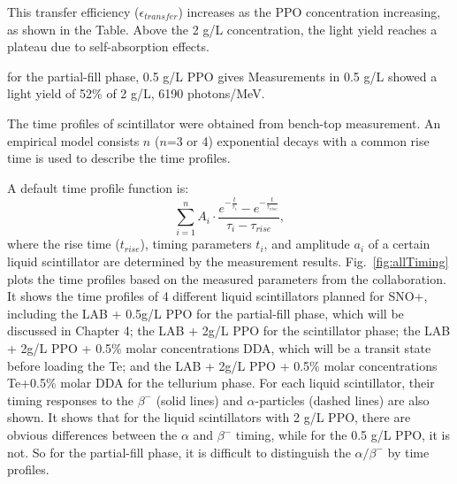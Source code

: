 
This transfer efficiency ($\mathcal{\epsilon}_{transfer}$) increases as the PPO concentration increasing, as shown in the Table. Above the 2 g/L concentration, the light yield reaches a plateau due to self-absorption effects\cite{collaboration2020development}.

for the partial-fill phase, 0.5 g/L PPO gives Measurements in 0.5 g/L showed a light yield of 52\% of 2 g/L,  
6190 photons/MeV\cite{tanner0p5,joshW1}.



The time profiles of scintillator were obtained from bench-top measurement. An empirical model consists $n$ ($n$=3 or 4) exponential decays with a common rise time is used to describe the time profiles\cite{biller2020slow}.

A default time profile function is:
\begin{equation}
\sum^{n}_{i=1}A_i\cdot\frac{e^{-\frac{t}{\tau_i}}-e^{-\frac{t}{\tau_{rise}}}}{\tau_i-\tau_{rise}},
\end{equation}
where the rise time ($t_{rise}$), timing parameters $t_i$, and amplitude $a_i$ of a certain liquid scintillator are determined by the measurement results. Fig.~\ref{fig:allTiming} plots the time profiles based on the measured parameters from the collaboration\cite{chicagoTiming,tanner0p5,tannerTeDDA,joshW1}. It shows the time profiles of 4 different liquid scintillators planned for SNO+, including the LAB + 0.5g/L PPO for the partial-fill phase, which will be discussed in Chapter 4; the LAB + 2g/L PPO for the scintillator phase; the LAB + 2g/L PPO + 0.5\% molar concentrations DDA, which will be a transit state before loading the Te; and the LAB + 2g/L PPO + 0.5\% molar concentrations Te+0.5\% molar DDA for the tellurium phase. For each liquid scintillator, their timing responses to the $\beta^-$ (solid lines) and $\alpha$-particles (dashed lines) are also shown. It shows that for the liquid scintillators with 2 g/L PPO, there are obvious differences between the $\alpha$ and $\beta^-$ timing, while for the 0.5 g/L PPO, it is not. So for the partial-fill phase, it is difficult to distinguish the $\alpha/\beta^-$ by time profiles.

